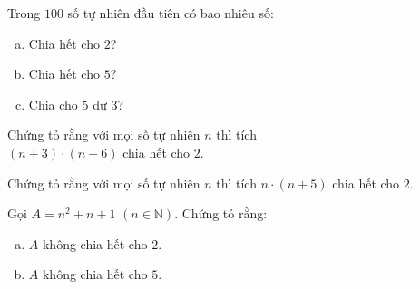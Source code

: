 \begin{bt}
Trong $100$ số tự nhiên đầu tiên có bao nhiêu số:
\begin{enumerate}[a)]
\item Chia hết cho $2$?
\item Chia hết cho $5$?
\item Chia cho $5$ dư $3$?
\end{enumerate}  
\end{bt}   \begin{bt}
Chứng tỏ rằng với mọi số tự nhiên $n$ thì tích \\$(n + 3)\cdot(n + 6)$ chia hết cho $2$.
\end{bt}   \begin{bt}
Chứng tỏ rằng với mọi số tự nhiên $n$ thì tích $n\cdot(n + 5)$ chia hết cho $2$.
\end{bt}   \begin{bt}
Gọi $A = {n^2} + n + 1\,\,\left( {n \in \mathbb{N}} \right)$. Chứng tỏ rằng:
\begin{enumerate}[a)]
\item $A$ không chia hết cho $2$.
\item $A$ không chia hết cho $5$.
\end{enumerate}  
\end{bt}